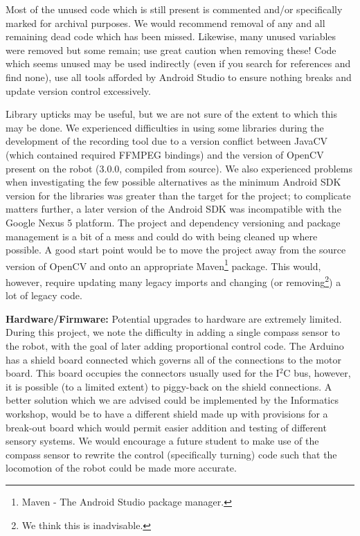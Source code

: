 \documentclass[a4paper,11pt,twoside,openright]{article}
\begin{document}
Most of the unused code which is still present is commented and/or
specifically marked for archival purposes. We would recommend
removal of any and all remaining dead code which has been
missed. Likewise, many unused variables were removed but some remain;
use great caution when removing these! Code which seems unused may be
used indirectly (even if you search for references and find none), use
all tools afforded by Android Studio to ensure nothing
breaks and update version control excessively.
\newline\par

Library upticks may be useful, but we are not sure of the extent to
which this may be done. We experienced difficulties in using some
libraries during the development of the recording tool due to a
version conflict between JavaCV (which contained required FFMPEG
bindings) and the version of OpenCV present on the robot (3.0.0,
compiled from source). We also experienced problems when investigating
the few possible alternatives as the minimum Android SDK version for
the libraries was greater than the target for the project; to
complicate matters further, a later version of the Android SDK was
incompatible with the Google Nexus 5 platform. The project and
dependency versioning and package management is a bit of a mess and
could do with being cleaned up where possible. A good start point
would be to move the project away from the source version of OpenCV
and onto an appropriate Maven\footnote{Maven - The Android Studio
  package manager.} package. This would, however, require updating
many legacy imports and changing (or removing\footnote{We think this
  is inadvisable.}) a lot of legacy code.\newline\par

\textbf{Hardware/Firmware:}
Potential upgrades to hardware are extremely limited. During this
project, we note the difficulty in adding a single compass sensor to
the robot, with the goal of later adding proportional control
code. The Arduino has a shield board connected which governs all of
the connections to the motor board. This board occupies the connectors
usually used for the I$^2$C bus, however, it is possible (to a limited
extent) to piggy-back on the shield connections. A better solution
which we are advised could be implemented by the Informatics workshop,
would be to have a different shield made up with provisions for a
break-out board which would permit easier addition and testing of
different sensory systems. We would encourage a future student to
make use of the compass sensor to rewrite the control (specifically
turning) code such that the locomotion of the robot could be made more
accurate.\newline\par
\end{document}
